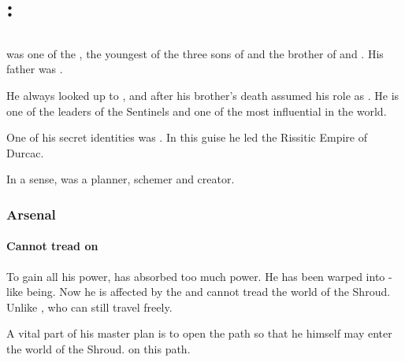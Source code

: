 \chapter{\Dragons: \Shaeeroth}















\section{\IrocasSecherdamon}
\index{\Secherdamon}
\index{\IrocasSecherdamon}
\IrocasSecherdamon{} was one of the \shaeeroths, the youngest of the three sons of {\Tiamat} and the brother of \Ishnaruchaefir and \Nexagglachel. 
His father was .

He always looked up to \Nexagglachel, and after his brother's death \Secherdamon{} assumed his role as \dragonking. He is one of the leaders of the Sentinels and one of the most influential \dragons{} in the world.

One of his secret identities was \HriistN. 
In this guise he led the Rissitic Empire of Durcac. 

In a sense, \Secherdamon{} was a planner, schemer and creator. 









\subsection{Arsenal}





\subsubsection{Cannot tread on \Miith}
To gain all his power, \Secherdamon{} has absorbed too much \xzaishannic{} power. 
He has been warped into \xzaishann-like being. 
Now he is affected by the  and cannot tread the world of the Shroud. Unlike \Ishnaruchaefir, who can still travel freely.

A vital part of his master plan is to open the path so that he himself may enter the world of the Shroud.  on this path.


